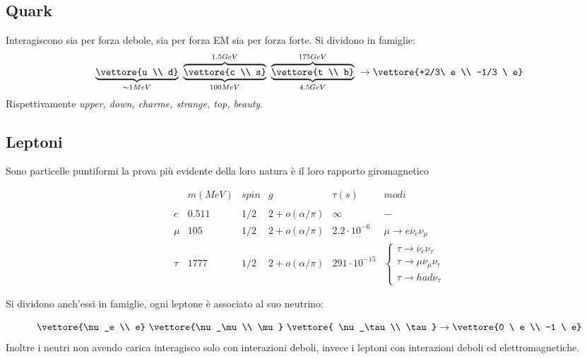\documentclass[12pt]{book}
\begin{document}
 \subsection{Quark}
 Interagiscono sia per forza debole, sia per forza EM sia per forza forte. Si dividono in famiglie:
 \begin{equation}
 	\underbrace{\vettore{u \\ d}}_{\sim 1 MeV} \ \overbrace{\underbrace{\vettore{c \\ s}}_{100MeV}}^{1.5 GeV} \ \overbrace{\underbrace{\vettore{t \\ b}}_{4.5 GeV}}^{175GeV} \ \rightarrow \vettore{+2/3\ e \\ -1/3 \ e}
 \end{equation}
 Rispettivamente \emph{upper, down, charme, strange, top, beauty}.
 
\subsection{Leptoni}
Sono particelle puntiformi la prova più evidente della loro natura è il loro rapporto giromagnetico

\begin{equation}
	\boxed{\begin{matrix}
		& m (MeV) & spin & g & \tau (s) & modi\\
		\ \\
		e & 0.511 & 1/2 & 2+o(\alpha / \pi ) & \infty & -\\
		\mu & 105 & 1/2 & 2+ o	(\alpha/ \pi) & 2.2 \cdot 10^{-6} & \mu \rightarrow e \overline \nu_e \nu_\mu \\
		\tau & 1777 & 1/2 & 2+ o(\alpha/\pi) & 291 \cdot 10^{-15} & \begin{cases}
 	\tau \rightarrow \overline \nu_e \nu_\tau \\
 	\tau \rightarrow \mu \overline \nu_\mu \nu_\tau \\
 	\tau \rightarrow had \nu_\tau
 \end{cases}
	\end{matrix}}
\end{equation}

Si dividono anch'essi in famiglie, ogni leptone è associato al suo neutrino:

\begin{equation}
	\vettore{\nu_e \\ e} \ \vettore{\nu_\mu \\ \mu } \ \vettore{ \nu_\tau \\ \tau} \rightarrow \vettore{0 \ e \\ -1 \ e}
\end{equation}
Inoltre i neutri non avendo carica interagisco solo con interazioni deboli, invece i leptoni con interazioni deboli ed elettromagnetiche.
\end{document}
